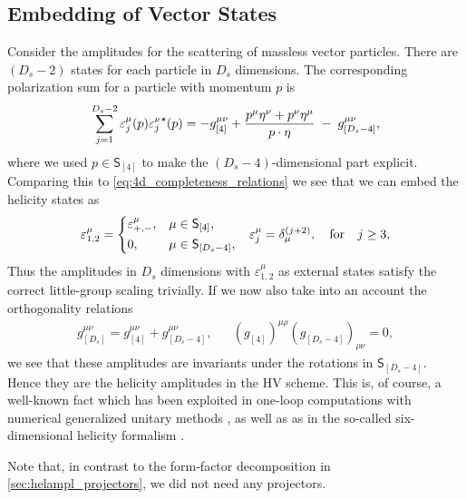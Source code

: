 \subsection{Embedding of Vector States}
\label{sec:embedding_vectors}

Consider the amplitudes for the scattering of massless vector particles.
There are $(D_s - 2)$ states for each particle in $D_s$ dimensions. 
The corresponding polarization sum for a particle with momentum $p$ is 
\begin{equation}
  \sum_{j=1}^{D_s-2} \varepsilon^\mu_j(p){\varepsilon^\nu_j}^{\star{}}(p) = -g_{[4]}^{\mu\nu} + \frac{p^\mu \eta^\nu + p^\nu \eta^\mu}{\sp(p,\eta)} \;-\; g_{[D_s-4]}^{\mu\nu}, 
\end{equation}
where we used $p \in \mathsf{S}_{[4]}$
to make the $(D_s-4)$-dimensional part explicit.
Comparing this to \cref{eq:4d_completeness_relations} we see that we can embed the helicity states as
\begin{align} \label{eq:embedding_vectors}
  \varepsilon_{1,2}^\mu =
    \begin{dcases}
      \varepsilon^\mu_{+,-}, & \mu\in \mathsf{S}_{[4]},\\
      0, & \mu\in \mathsf{S}_{[D_s-4]},\\
    \end{dcases}
    &&
  \varepsilon_{j}^\mu = \delta^{(j+2)}_\mu, \qfor j\geq 3,
\end{align}
Thus the amplitudes in $D_s$ dimensions with $\varepsilon_{1,2}^\mu$ as external states satisfy the correct little-group scaling trivially.
If we now also take into an account the orthogonality relations 
\begin{align}
  g_{[D_s]}^{\mu\nu} = g^{\mu\nu}_{[4]}+g^{\mu\nu}_{[D_s-4]}, && (g_{[4]})^{\mu\rho}(g_{[D_s-4]})_{\rho\nu} = 0,
\end{align}
we see that these amplitudes are invariants under the rotations in $\mathsf{S}_{[D_s-4]}$.
Hence they are the helicity amplitudes in the HV scheme.
This is, of course, a well-known fact which has been exploited in one-loop computations with numerical generalized
unitary methods \cite{Ellis:2007br,Giele:2008ve}, as well as as 
in the so-called six-dimensional helicity formalism \cite{Bern2011,Cheung:2009dc,Badger:2013gxa,Badger:2017jhb}.

Note that, in contrast to the form-factor decomposition in \cref{sec:helampl_projectors}, we did not need any projectors.


